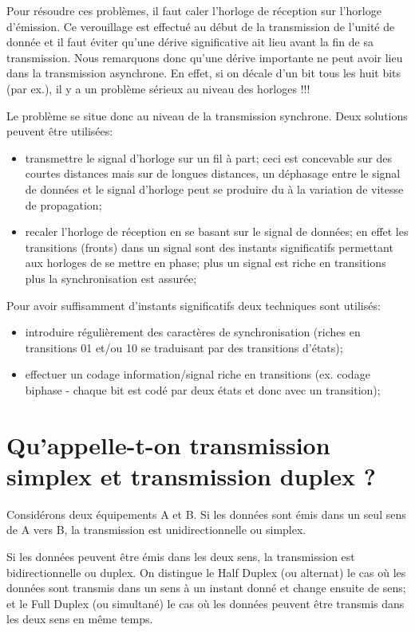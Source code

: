 Pour résoudre ces problèmes, il faut caler l'horloge de réception sur l'horloge d'émission. Ce
verouillage est effectué au début de la transmission de l'unité de donnée et il faut éviter
qu'une dérive significative ait lieu avant la fin de sa transmission. Nous remarquons donc
qu'une dérive importante ne peut avoir lieu dans la transmission asynchrone. En effet, si on
décale d'un bit tous les huit bits (par ex.), il y a un problème sérieux au niveau des
horloges !!!

Le problème se situe donc au niveau de la transmission synchrone. Deux solutions peuvent être
utilisées:

\begin{itemize}
	\item transmettre le signal d'horloge sur un fil à part; ceci est concevable sur des courtes
distances mais sur de longues distances, un déphasage entre le signal de données et le signal
d'horloge peut se produire du à la variation de vitesse de propagation;
	\item recaler l'horloge de réception en se basant sur le signal de données; en effet les
transitions (fronts) dans un signal sont des instants significatifs permettant aux horloges de
se mettre en phase; plus un signal est riche en transitions plus la synchronisation est
assurée;
\end{itemize}

Pour avoir suffisamment d'instants significatifs deux techniques sont utilisés:

\begin{itemize}
	\item introduire régulièrement des caractères de synchronisation (riches en transitions 01 et/ou
10 se traduisant par des transitions d'états);
\item effectuer un codage information/signal riche en transitions (ex. codage biphase - chaque bit
est codé par deux états et donc avec un transition);
\end{itemize}


\section{Qu'appelle-t-on transmission simplex et transmission duplex ?}
Considérons deux équipements A et B. Si les données sont émis dans un seul sens de A vers B,
la transmission est unidirectionnelle ou simplex.

Si les données peuvent être émis dans les deux sens, la transmission est bidirectionnelle ou
duplex. On distingue le Half Duplex (ou alternat) le cas où les données sont transmis dans un
sens à un instant donné et change ensuite de sens; et le Full Duplex (ou simultané) le cas où
les données peuvent être transmis dans les deux sens en même temps.


